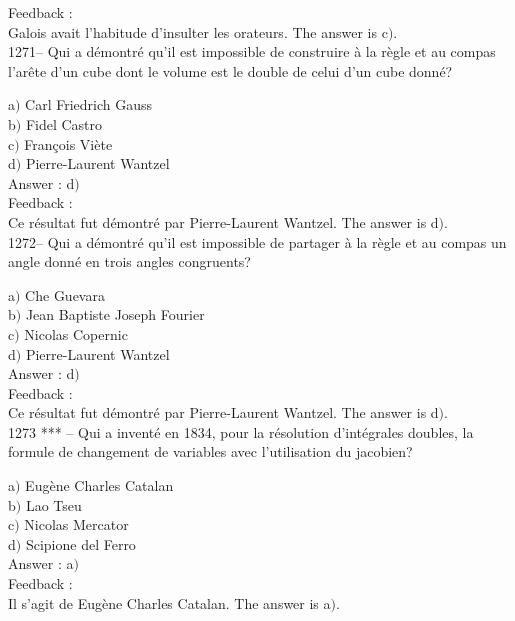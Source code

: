 \documentclass[letterpaper, 12pt]{article}
\begin{document}
Feedback : \\
Galois avait l'habitude d'insulter les orateurs.
The answer is c$)$.\\

1271-- Qui a d\'emontr\'e qu'il est impossible de construire \`a la
r\`egle et au compas l'ar\^ete d'un cube dont le volume est le
double de celui d'un cube donn\'e?

a$)$ Carl Friedrich Gauss \\
b$)$ Fidel Castro \\
c$)$ Fran\c cois Vi\`ete \\
d$)$ Pierre-Laurent Wantzel\\

Answer : d$)$\\

Feedback : \\
Ce r\'esultat fut d\'emontr\'e par Pierre-Laurent Wantzel.
The answer is d$)$.\\

1272-- Qui a d\'emontr\'e qu'il est impossible de partager \`a la
r\`egle et au compas un angle donn\'e en trois angles congruents?

a$)$ Che Guevara \\
b$)$ Jean Baptiste Joseph Fourier \\
c$)$ Nicolas Copernic \\
d$)$ Pierre-Laurent Wantzel\\

Answer : d$)$\\

Feedback : \\
Ce r\'esultat fut d\'emontr\'e par Pierre-Laurent Wantzel.
The answer is d$)$.\\

1273 *** -- Qui a invent\'e en 1834, pour la r\'esolution
d'int\'egrales doubles, la formule de changement de variables avec
l'utilisation du jacobien?

a$)$ Eug\`ene Charles Catalan \\
b$)$ Lao Tseu \\
c$)$ Nicolas Mercator \\
d$)$ Scipione del Ferro\\

Answer : a$)$\\

Feedback : \\
Il s'agit de Eug\`ene Charles Catalan.
The answer is a$)$.\\
\end{document}
